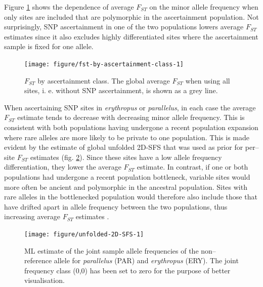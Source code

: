 \documentclass[a4paper,12pt,times,print,index,custombib,custommargin]{PhDThesisPSnPDF}\usepackage[]{graphicx}\usepackage[]{color}
\newenvironment{knitrout}{}{} %
\begin{document}
Figure \ref{Fig:fst-by-ascert-class} shows the dependence of average $F_{ST}$ on the minor allele frequency when only sites are included that are polymorphic in the ascertainment population. Not surprisingly, SNP ascertainment in one of the two populations lowers average $F_{ST}$ estimates since it also excludes highly differentiated sites where the ascertainment sample is fixed for one allele.
%
\begin{figure}[htb]
\centering
\begin{knitrout}
\color{fgcolor}

{\centering \texttt{[image: figure/fst-by-ascertainment-class-1]} 

}



\end{knitrout}
\caption{$F_{ST}$ by ascertainment class. The global average $F_{ST}$ when using all sites, i. e. without SNP ascertainment, is shown as a grey line.}
\label{Fig:fst-by-ascert-class}
\end{figure}
%
When ascertaining SNP sites in \textit{erythropus} or \textit{parallelus}, in each case the average $F_{ST}$ estimate tends to decrease with decreasing minor allele frequency. This is consistent with both populations having undergone a recent population expansion where rare alleles are more likely to be private to one population. This is made evident by the estimate of global unfolded 2D-\gls{SFS} that was used as prior for per--site $F_{ST}$ estimates (fig. \ref{Fig:unfolded-2D-SFS}). Since these sites have a low allele frequency differentiation, they lower the average $F_{ST}$ estimate. In contrast, if one or both populations had undergone a recent population bottleneck, variable sites would more often be ancient and polymorphic in the ancestral population. Sites with rare alleles in the bottlenecked population would therefore also include those that have drifted apart in allele frequency between the two populations, thus increasing average $F_{ST}$ estimates \citep{Bhatia2013}.
%
\begin{figure}[H]
\centering
\begin{knitrout}
\color{fgcolor}

{\centering \texttt{[image: figure/unfolded-2D-SFS-1]} 

}



\end{knitrout}
\caption{ML estimate of the joint sample allele frequencies of the non--reference allele for \textit{parallelus} (PAR) and \textit{erythropus} (ERY). The joint frequency class (0,0) has been set to zero for the purpose of better visualisation.}
\label{Fig:unfolded-2D-SFS}
\end{figure}
%
\end{document}

